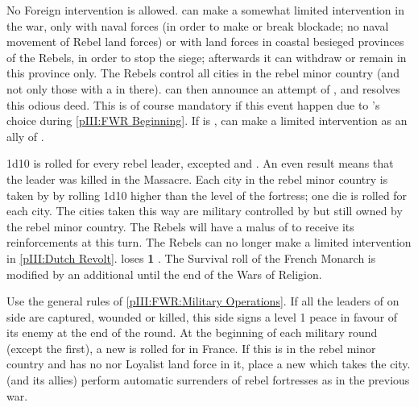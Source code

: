 \phdipl
\aparag No Foreign intervention is allowed.
\aparag \REB can make a somewhat limited intervention in the war, only with
naval forces (in order to make or break blockade; no naval movement of Rebel
land forces) or with land forces in coastal besieged provinces of the Rebels,
in order to stop the siege; afterwards it can withdraw or remain in this
province only.
\aparag The Rebels control all cities in the rebel minor country (and not only
those with a \REVOLT in there).
\aparag \FRA can then announce an attempt of
, and resolves this odious deed. This is
of course mandatory if this event happen due to \FRA's choice during
\ref{pIII:FWR Beginning}.
\aparag If \FRA is \CATHCR, \LIG can make a limited intervention as an ally of
\FRA.

\begin{digressions}



  \phdipl
  \aparag 1d10 is rolled for every rebel leader, excepted  and \leaderNavarre. An even result means that the leader was killed
  in the Massacre.
  \aparag Each city in the rebel minor country is taken by \FRA by rolling
  1d10 higher than the level of the fortress; one die is rolled for each
  city. The cities taken this way are military controlled by \FRA but still
  owned by the rebel minor country.
  \aparag The Rebels will have a malus of  to receive its
  reinforcements at this turn.
  \aparag The Rebels can no longer make a limited intervention in
  \ref{pIII:Dutch Revolt}.
  \aparag \FRA loses {\bf 1} \STAB.
  \aparag The Survival roll of the French Monarch is modified by an additional
   until the end of the Wars of Religion.



  \phmil
  \aparag Use the general rules of \ref{pIII:FWR:Military Operations}.
  \aparag If all the leaders of on side are captured, wounded or killed, this
  side signs a level 1 peace in favour of its enemy at the end of the round.
  \aparag At the beginning of each military round (except the first), a new
  \REVOLT is rolled for in France. If this \REVOLT is in the rebel minor
  country and has no \REVOLT nor Loyalist land force in it, place a new
  \REVOLT \facemoins which takes the city.
  \aparag \FRA (and its allies) %
  perform automatic surrenders of rebel fortresses as in the previous war.
\end{digressions}

